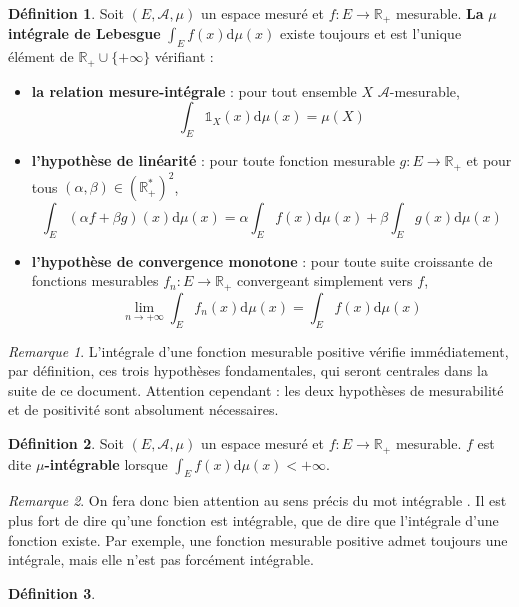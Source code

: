 \documentclass[french]{report}
\theoremstyle{plain}
\theoremstyle{definition}
\newtheorem{defi}{Définition}[section]
\theoremstyle{remark}
\newtheorem{rem}{Remarque}[section]
\newcommand\itemb{\item[$\bullet$]}
\begin{document}
\begin{defi}
  Soit $\left(E,\mathcal{A},\mu\right)$ un espace mesuré et $f:E\rightarrow\mathbb{R}_+$ mesurable.
  \textbf{La } $\mu $\textbf{ intégrale de Lebesgue } $\displaystyle\int_Ef(x)\text{d}\mu(x)$ existe toujours et est l'unique élément de $\mathbb{R}_+\cup\{+\infty\}$ vérifiant :
  \begin{itemize}
    \itemb \textbf{la relation mesure-intégrale} : pour tout ensemble $X$ $\mathcal{A}$-mesurable,
    $$
    \int_E\mathds{1}_X(x)\text{d}\mu(x)=\mu(X)
    $$ 
    \itemb \textbf{l'hypothèse de linéarité} : pour toute fonction mesurable $g:E\rightarrow\mathbb{R}_+$ et pour tous $\left(\alpha,\beta\right) \in \left(\mathbb{R}_+^*\right)^2$,
    $$
    \int_E (\alpha f + \beta g)(x) \text{d}\mu(x)=\alpha\int_Ef(x)\text{d}\mu(x) + \beta\int_Eg(x)\text{d}\mu(x)
    $$
    \itemb \textbf{l'hypothèse de convergence monotone} : pour toute suite croissante de fonctions mesurables $f_n:E\rightarrow\mathbb{R}_+$ convergeant simplement vers $f$,
    $$
    \lim_{n\rightarrow+\infty}\int_Ef_n(x)\text{d}\mu(x)=\int_Ef(x)\text{d}\mu(x)
    $$
  \end{itemize}
\end{defi}

\begin{rem}
  L'intégrale d'une fonction mesurable positive vérifie immédiatement, par définition, ces trois hypothèses fondamentales, qui seront centrales dans la suite de ce document.
  Attention cependant : les deux hypothèses de mesurabilité et de positivité sont absolument nécessaires.
\end{rem}

\begin{defi}
  Soit $\left(E,\mathcal{A},\mu\right)$ un espace mesuré et $f:E\rightarrow\mathbb{R}_+$ mesurable.
  $f$ est dite $\mu$\textbf{-intégrable} lorsque $\displaystyle\int_Ef(x)\text{d}\mu(x) < +\infty$.
\end{defi}

\begin{rem}
  On fera donc bien attention au sens précis du mot \og intégrable \fg.
  Il est plus fort de dire qu'une fonction est intégrable, que de dire que l'intégrale d'une fonction existe.
  Par exemple, une fonction mesurable positive admet toujours une intégrale, mais elle n'est pas forcément intégrable.
\end{rem}

\begin{defi}
\end{defi}
\end{document}
